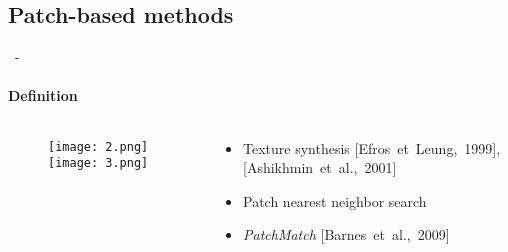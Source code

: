 \documentclass[aspectratio=169, 22pt]{beamer}
\begin{document}
\subsection{Patch-based methods}
\begin{frame}{\secname~- \subsecname}
  \framesubtitle{Definition}
  \begin{columns}
    \begin{column}{0.6\linewidth}
      \begin{figure}
        \centering
        \texttt{[image: 2.png]}
        \texttt{[image: 3.png]}
      \end{figure}
    \end{column}
    
    \begin{column}{0.4\linewidth}
      \begin{itemize}
      \item Texture synthesis [Efros et Leung, 1999], [Ashikhmin et al., 2001]
        \vspace{1em}
      \item Patch nearest neighbor search
      \item \emph{PatchMatch} [Barnes et al., 2009]
      \end{itemize}
      


    \end{column}
  \end{columns}  
\end{frame}
\end{document}
